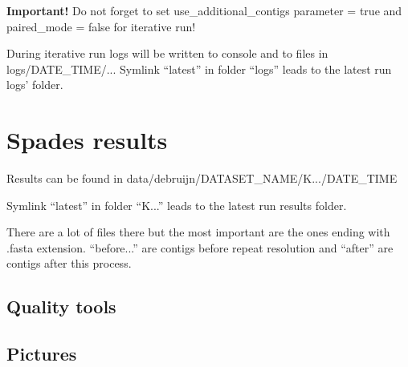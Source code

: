 \documentclass[a4paper,10pt]{article}
\begin{document}
\textbf{Important!} Do not forget to set use\_additional\_contigs parameter = true and paired\_mode = false for iterative run!

During iterative run logs will be written to console and to files in logs/DATE\_TIME/...
Symlink ``latest'' in folder ``logs'' leads to the latest run logs' folder.

\section{Spades results}
Results can be found in data/debruijn/DATASET\_NAME/K.../DATE\_TIME

Symlink ``latest'' in folder ``K...'' leads to the latest run results folder.

There are a lot of files there but the most important are the ones ending with .fasta extension. ``before...'' are contigs before repeat
resolution and ``after'' are contigs after this process.


\subsection{Quality tools}
\subsection{Pictures}
\end{document}
